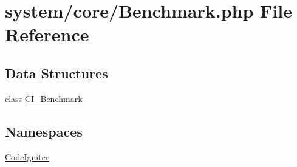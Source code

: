 \hypertarget{_benchmark_8php}{\section{system/core/\-Benchmark.php File Reference}
\label{_benchmark_8php}
}
\subsection*{Data Structures}
\begin{DoxyCompactItemize}
\item 
class \hyperlink{class_c_i___benchmark}{C\-I\-\_\-\-Benchmark}
\end{DoxyCompactItemize}
\subsection*{Namespaces}
\begin{DoxyCompactItemize}
\item 
\hyperlink{namespace_code_igniter}{Code\-Igniter}
\end{DoxyCompactItemize}
